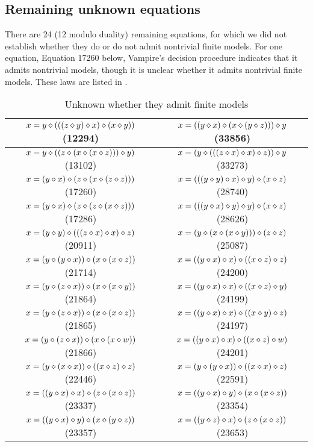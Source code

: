 \subsection{Remaining unknown equations}

There are 24 (12 modulo duality) remaining equations, for which we did not establish whether they do or do not admit nontrivial finite models.
For one equation, Equation 17260 below, Vampire's decision procedure indicates that it admits nontrivial models, though it is unclear whether it admits nontrivial finite models.
These laws are listed in .

\begin{table}[h]
\begin{tabular}{|c|c|}
\hline
$x = y \diamond (((z \diamond y) \diamond x) \diamond (x \diamond y))$ (12294) & $x = ((y \diamond x) \diamond (x \diamond (y \diamond z))) \diamond y$ (33856) \\ \hline
$x = y \diamond ((z \diamond (x \diamond (x \diamond z))) \diamond y)$ (13102) & $x = (y \diamond (((z \diamond x) \diamond x) \diamond z)) \diamond y$ (33273) \\ \hline
$x = (y \diamond x) \diamond (z \diamond (x \diamond (z \diamond z)))$ (17260) & $x = (((y \diamond y) \diamond x) \diamond y) \diamond (x \diamond z)$ (28740) \\ \hline
$x = (y \diamond x) \diamond (z \diamond (z \diamond (x \diamond z)))$ (17286) & $x = (((y \diamond x) \diamond y) \diamond y) \diamond (x \diamond z)$ (28626) \\ \hline
$x = (y \diamond y) \diamond (((z \diamond x) \diamond x) \diamond z)$ (20911) & $x = (y \diamond (x \diamond (x \diamond y))) \diamond (z \diamond z)$ (25087) \\ \hline
$x = (y \diamond (y \diamond x)) \diamond (x \diamond (x \diamond z))$ (21714) & $x = ((y \diamond x) \diamond x) \diamond ((x \diamond z) \diamond z)$ (24200) \\ \hline
$x = (y \diamond (z \diamond x)) \diamond (x \diamond (x \diamond y))$ (21864) & $x = ((y \diamond x) \diamond x) \diamond ((x \diamond z) \diamond y)$ (24199) \\ \hline
$x = (y \diamond (z \diamond x)) \diamond (x \diamond (x \diamond z))$ (21865) & $x = ((y \diamond x) \diamond x) \diamond ((x \diamond y) \diamond z)$ (24197) \\ \hline
$x = (y \diamond (z \diamond x)) \diamond (x \diamond (x \diamond w))$ (21866) & $x = ((y \diamond x) \diamond x) \diamond ((x \diamond z) \diamond w)$ (24201) \\ \hline
$x = (y \diamond (x \diamond x)) \diamond ((x \diamond z) \diamond z)$ (22446) & $x = (y \diamond (y \diamond x)) \diamond ((x \diamond x) \diamond z)$ (22591) \\ \hline
$x = ((y \diamond x) \diamond x) \diamond (z \diamond (x \diamond z))$ (23337) & $x = ((y \diamond x) \diamond y) \diamond (x \diamond (x \diamond z))$ (23354) \\ \hline
$x = ((y \diamond x) \diamond y) \diamond (x \diamond (y \diamond z))$ (23357) & $x = ((y \diamond z) \diamond x) \diamond (z \diamond (x \diamond z))$ (23653) \\ \hline
\end{tabular}
\caption{Unknown whether they admit finite models}
\label{table3}
\end{table}
